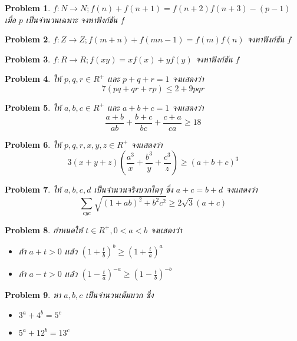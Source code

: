 \documentclass[a4paper,12pt]{article}
\newtheorem{problem}{Problem}
\begin{document}
	\begin{problem}
		$f:N\rightarrow{N} ; f(n)+f(n+1)=f(n+2)f(n+3)-(p-1)$ เมื่อ $p$ เป็นจำนวนเฉพาะ จงหาฟังก์ชัน $f$
	\end{problem}
	\begin{problem}
		$f:Z \rightarrow Z ; f(m+n)+f(mn-1)=f(m)f(n)$ จงหาฟังก์ชัน $f$
	\end{problem}
	\begin{problem}
		$f:R \rightarrow R ; f(xy)=xf(x)+yf(y)$ จงหาฟังก์ชัน $f$
	\end{problem}
	\begin{problem}
		ให้ $p,q,r \in R^+$ เเละ $p+q+r=1$ จงเเสดงว่า $$7(pq+qr+rp) \le 2+9pqr$$
	\end{problem}
	\begin{problem}
		ให้ $a,b,c \in R^+$ เเละ $a+b+c=1$ จงเเสดงว่า $$\frac{a+b}{ab}+\frac{b+c}{bc}+\frac{c+a}{ca} \ge 18$$
	\end{problem}
	\begin{problem}
		ให้ $p,q,r,x,y,z \in R^+$ จงเเสดงว่า $$3(x+y+z)(\frac{a^3}{x}+\frac{b^3}{y}+\frac{c^3}{z}) \ge (a+b+c)^3$$
	\end{problem}
	\begin{problem}
		ให้ $a,b,c,d$ เป็นจำนวนจริงบวกใดๆ ซึ่ง $a+c=b+d$ จงเเสดงว่า $$\sum_{cyc}\sqrt{(1+ab)^2+b^2c^2} \ge 2\sqrt{3}(a+c)$$
	\end{problem}
	\begin{problem}
		กำหนดให้ $t\in R^+, 0<a<b$ จงเเสดงว่า 
		\begin{itemize}
			\item ถ้า $a+t>0$ เเล้ว $(1+\frac{t}{b})^b \ge (1+\frac{t}{a})^a$
			\item ถ้า $a-t>0$ เเล้ว $(1-\frac{t}{a})^{-a} \ge (1-\frac{t}{b})^{-b}$
		\end{itemize}
	\end{problem}
	\begin{problem}
		หา $a,b,c$ เป็นจำนวนเต็มบวก ซึ่ง
		\begin{itemize}
			\item $3^a+4^b = 5^c$
			\item $5^a+12^b=13^c$
		\end{itemize}
	\end{problem}
\end{document}
